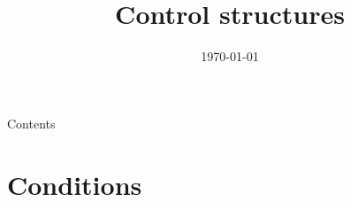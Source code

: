 
\newcommand{\topic}{
	Control structures
}
\usepackage{tikz}

\title{\topic}
\supertitle{\course}
\date{\today}



\maketitle

\begin{frame}{Contents}
	\tableofcontents
\end{frame}

\section{Conditions}

